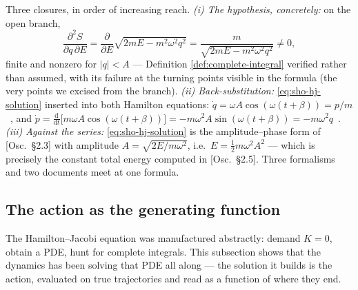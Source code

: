 \documentclass[11pt]{article}
\theoremstyle{plain}
\theoremstyle{definition}
\theoremstyle{remark}
\newcommand{\dd}{\mathrm{d}}
\newcommand{\pd}[2]{\frac{\partial #1}{\partial #2}}
\newcommand{\tot}[2]{\frac{\dd #1}{\dd #2}}
\begin{document}
Three closures, in order of increasing reach. \emph{(i) The
hypothesis, concretely:} on the open branch,
\begin{equation}
  \frac{\partial^2 S}{\partial q\,\partial E}
  = \pd{}{E}\sqrt{2mE - m^2\omega^2 q^2}
  = \frac{m}{\sqrt{2mE - m^2\omega^2 q^2}} \ne 0 ,
\end{equation}
finite and nonzero for $|q| < A$ --- Definition
\ref{def:complete-integral} verified rather than assumed, with its
failure at the turning points visible in the formula (the very points
we excised from the branch). \emph{(ii) Back-substitution:}
\eqref{eq:sho-hj-solution} inserted into both Hamilton equations:
$\dot q = \omega A\cos(\omega(t+\beta)) = p/m$~\checkmark, and $\dot p
= \tot{}{t}\bigl[m\omega A\cos(\omega(t+\beta))\bigr]
= -m\omega^2 A \sin(\omega(t+\beta)) = -m\omega^2 q$~\checkmark.
\emph{(iii) Against the series:} \eqref{eq:sho-hj-solution} is the
amplitude--phase form of [Osc.\ \S2.3] with amplitude
$A = \sqrt{2E/m\omega^2}$, i.e.\ $E = \tfrac12 m\omega^2 A^2$ ---
which is precisely the constant total energy computed in
[Osc.\ \S2.5]. Three formalisms and two documents meet at one
formula.

\subsection{The action as the generating function}
\label{sec:hj-action}

The Hamilton--Jacobi equation was manufactured abstractly: demand
$K = 0$, obtain a PDE, hunt for complete integrals. This subsection
shows that the dynamics has been solving that PDE all along --- the
solution it builds is the action, evaluated on true trajectories and
read as a function of where they end.
\end{document}
